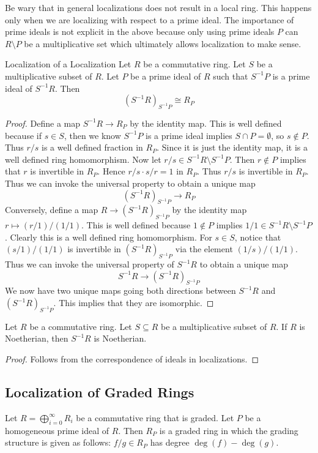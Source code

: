\documentclass[a4paper]{article}
\begin{document}
Be wary that in general localizations does not result in a local ring. This happens only when we are localizing with respect to a prime ideal. The importance of prime ideals is not explicit in the above because only using prime ideals $P$ can $R\setminus P$ be a multiplicative set which ultimately allows localization to make sense. 

\begin{prp}{Localization of a Localization}{} Let $R$ be a commutative ring. Let $S$ be a multiplicative subset of $R$. Let $P$ be a prime ideal of $R$ such that $S^{-1}P$ is a prime ideal of $S^{-1}R$. Then $$(S^{-1}R)_{S^{-1}P}\cong R_P$$ 
\begin{proof}
Define a map $S^{-1}R\to R_P$ by the identity map. This is well defined because if $s\in S$, then we know $S^{-1}P$ is a prime ideal implies $S\cap P=\emptyset$, so $s\notin P$. Thus $r/s$ is a well defined fraction in $R_P$. Since it is just the identity map, it is a well defined ring homomorphism. Now let $r/s\in S^{-1}R\setminus S^{-1}P$. Then $r\notin P$ implies that $r$ is invertible in $R_P$. Hence $r/s\cdot s/r=1$ in $R_P$. Thus $r/s$ is invertible in $R_P$. Thus we can invoke the universal property to obtain a unique map $$(S^{-1}R)_{S^{-1}P}\to R_P$$ Conversely, define a map $R\to (S^{-1}R)_{S^{-1}P}$ by the identity map $r\mapsto (r/1)/(1/1)$. This is well defined because $1\notin P$ implies $1/1\in S^{-1}R\setminus S^{-1}P$. Clearly this is a well defined ring homomorphism. For $s\in S$, notice that $(s/1)/(1/1)$ is invertible in $(S^{-1}R)_{S^{-1}P}$ via the element $(1/s)/(1/1)$. Thus we can invoke the universal property of $S^{-1}R$ to obtain a unique map $$S^{-1}R\to(S^{-1}R)_{S^{-1}P}$$ We now have two unique maps going both directions between $S^{-1}R$ and $(S^{-1}R)_{S^{-1}P}$. This implies that they are isomorphic. 
\end{proof}
\end{prp}

\begin{lmm}{}{} Let $R$ be a commutative ring. Let $S\subseteq R$ be a multiplicative subset of $R$. If $R$ is Noetherian, then $S^{-1}R$ is Noetherian. 
\begin{proof}
Follows from the correspondence of ideals in localizations. 
\end{proof}
\end{lmm}

\subsection{Localization of Graded Rings}
\begin{prp}{}{} Let $R=\bigoplus_{i=0}^\infty R_i$ be a commutative ring that is graded. Let $P$ be a homogeneous prime ideal of $R$. Then $R_P$ is a graded ring in which the grading structure is given as follows: $f/g\in R_P$ has degree $\deg(f)-\deg(g)$. 
\end{prp}
\end{document}
